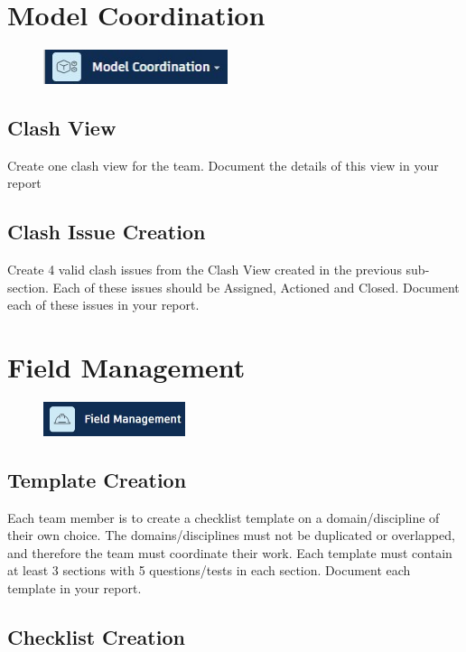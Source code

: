 \section{Model Coordination}
\begin{figure}[h!t]
	\includegraphics[height=1.0cm]{RevitAssets/modelmgmt}
	\label{fig:modelmgmt}
\end{figure}


\subsection{Clash View}
Create one clash view for the team.  Document the details of this view in your report
\subsection{Clash Issue Creation}
Create 4 valid clash issues from the Clash View created in the previous sub-section.  Each of these issues should be Assigned, Actioned and Closed.  Document each of these issues in your report.


\section{Field Management}

\begin{figure}[h!t]
	\includegraphics[height=1.0cm]{RevitAssets/fieldmgmt}
	\label{fig:dieldmgmt}
\end{figure}



\subsection{Template Creation}

Each team member is to create a checklist template on a domain/discipline of their own choice.  The domains/disciplines must not be duplicated or overlapped, and therefore the team must coordinate their work.  Each template must contain at least 3 sections with 5 questions/tests in each section.  Document each template in your report.

\subsection{Checklist Creation}

